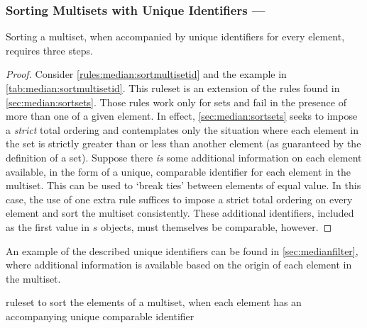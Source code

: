 \subsubsection{Sorting Multisets with Unique Identifiers --- }\label{sec:median:sortmultisetid}

\begin{proposition}\label{prop:median:sortmultisetid}
Sorting a multiset, when accompanied by unique identifiers for every element, requires three steps.
\end{proposition}

\begin{proof}
Consider \cref{rules:median:sortmultisetid} and the example in \cref{tab:median:sortmultisetid}.  This \gls{ruleset} is an extension of the rules found in \cref{sec:median:sortsets}.  Those rules work only for sets and fail in the presence of more than one of a given element.  In effect, \cref{sec:median:sortsets} seeks to impose a \emph{strict} total ordering and contemplates only the situation where each element in the set is strictly greater than or less than another element (as guaranteed by the definition of a set).  Suppose there \emph{is} some additional information on each element available, in the form of a unique, comparable identifier for each element in the multiset. This can be used to `break ties' between elements of equal value.  In this case, the use of one extra rule suffices to impose a strict total ordering on every element and sort the multiset consistently.  These additional identifiers, included as the first value in \(s\) objects, must themselves be comparable, however.
\end{proof}

An example of the described unique identifiers can be found in \vref{sec:medianfilter}, where additional information is available based on the origin of each element in the multiset.

\begin{cprulesetfloat}
\begin{cpruleset}


\end{cpruleset}
\caption{\label{rules:median:sortmultisetid}\Gls{ruleset} to sort the elements of a multiset, when each element has an accompanying unique comparable identifier}
\end{cprulesetfloat}

